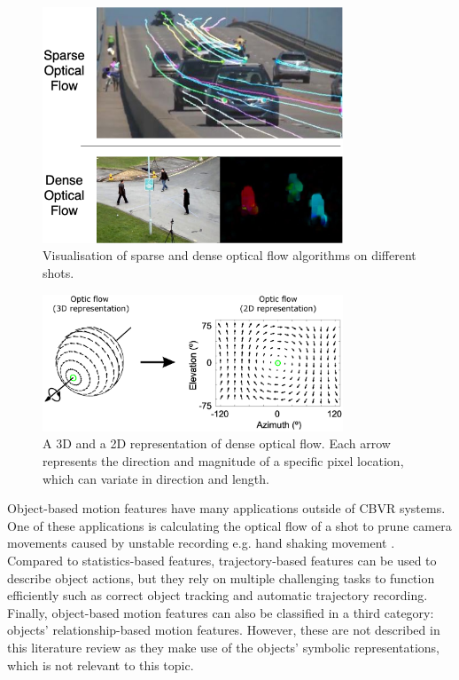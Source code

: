 \begin{itemize}
    \begin{figure}[h] 
    \centerline{\includegraphics[width=0.80\textwidth]{figures/optical_flow.png}}
    \caption{\label{fig:optical_flow}Visualisation of sparse and dense optical flow algorithms on different shots.}
    \end{figure}
        
    \begin{figure}[h] 
    \centerline{\includegraphics[width=0.80\textwidth]{figures/dense_optical_flow_representation.png}}
    \caption{\label{fig:dense_optical_flow_representation}A 3D and a 2D representation of dense optical flow. Each arrow represents the direction and magnitude of a specific pixel location, which can variate in direction and length.}
    \end{figure}
    
    Object-based motion features have many applications outside of CBVR systems. One of these applications is calculating the optical flow of a shot to prune camera movements caused by unstable recording e.g. hand shaking movement \cite{wang2016actionregonition}. Compared to statistics-based features, trajectory-based features can be used to describe object actions, but they rely on multiple challenging tasks to function efficiently such as correct object tracking and automatic trajectory recording. Finally, object-based motion features can also be classified in a third category: objects' relationship-based motion features. However, these are not described in this literature review as they make use of the objects' symbolic representations, which is not relevant to this topic.
\end{itemize}

